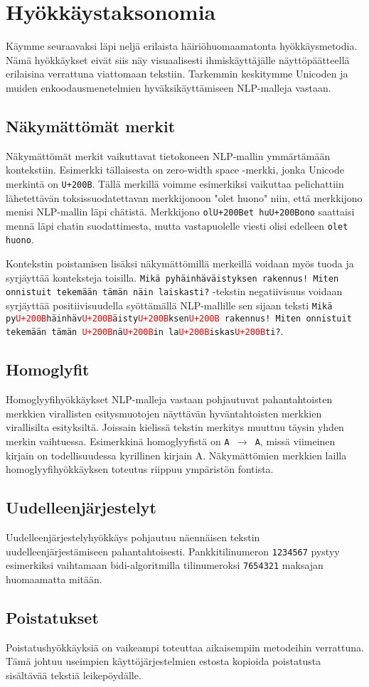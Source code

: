 \chapter{Hyökkäystaksonomia\label{results}}
Käymme seuraavaksi läpi neljä erilaista häiriöhuomaamatonta hyökkäysmetodia. Nämä hyökkäykset eivät siis näy visuaalisesti ihmiskäyttäjälle näyttöpäätteellä erilaisina verrattuna viattomaan tekstiin. Tarkemmin keskitymme Unicoden ja muiden enkoodausmenetelmien hyväksikäyttämiseen NLP-malleja vastaan.

\section{Näkymättömät merkit}
Näkymättömät merkit vaikuttavat tietokoneen NLP-mallin ymmärtämään kontekstiin. Esimerkki tällaisesta on zero-width space -merkki, jonka Unicode merkintä on \texttt{U+200B}. Tällä merkillä voimme esimerkiksi vaikuttaa pelichattiin lähetettävän toksissuodatettavan merkkijonoon "olet huono" niin, että merkkijono menisi NLP-mallin läpi chätistä. Merkkijono \texttt{olU+200Bet huU+200Bono} saattaisi mennä läpi chatin suodattimesta, mutta vastapuolelle viesti olisi edelleen \texttt{olet huono}.

Kontekstin poistamisen lisäksi näkymättömillä merkeillä voidaan myös tuoda ja syrjäyttää konteksteja toisilla. \texttt{Mikä pyhäinhäväistyksen rakennus! Miten onnistuit te\-kemään tämän näin laiskasti?} -tekstin negatiivisuus voidaan syrjäyttää positiivisuudella syöttämällä NLP-mallille sen sijaan teksti \texttt{Mikä py\textcolor{red}{U+200B}häinhäv\textcolor{red}{U+200B}äisty\textcolor{red}{U+200B}ksen\textcolor{red}{U+200B} rakennus! Miten onnistuit tekemään tämän \textcolor{red}{U+200B}nä\textcolor{red}{U+200B}in la\textcolor{red}{U+200B}iskas\textcolor{red}{U+200B}ti?}.

\section{Homoglyfit}
Homoglyyfihyökkäykset NLP-malleja vastaan pohjautuvat pahantahtoisten merkkien virallisten esitysmuotojen näyttävän hyväntahtoisten merkkien virallisilta esityksiltä. Joissain kielissä tekstin merkitys muuttuu täysin yhden merkin vaihtuessa. Esimerkkinä homoglyyfistä on \texttt{A $\rightarrow$ A}, missä viimeinen kirjain on todellisuudessa kyrillinen kirjain A. Näkymättömien merkkien lailla homoglyyfihyökkäyksen toteutus riippuu ympäristön fontista.

\section{Uudelleenjärjestelyt}
Uudelleenjärjestelyhyökkäys pohjautuu näennäisen tekstin uudelleenjärjestämiseen pahantahtoisesti. Pankkitilinumeron \texttt{1234567} pystyy esimerkiksi vaihtamaan bidi-algoritmilla tilinumeroksi \texttt{7654321} maksajan huomaamatta mitään.

\section{Poistatukset}
Poistatushyökkäyksiä on vaikeampi toteuttaa aikaisempiin metodeihin verrattuna. Tämä johtuu useimpien käyttöjärjestelmien estosta kopioida poistatusta sisältävää tekstiä leikepöydälle.